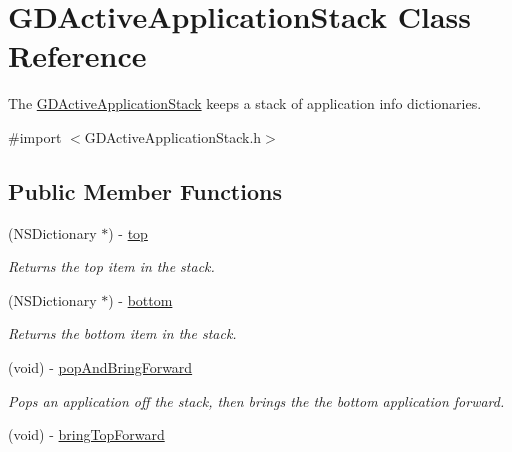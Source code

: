 \hypertarget{interface_g_d_active_application_stack}{
\section{GDActiveApplicationStack Class Reference}
\label{interface_g_d_active_application_stack}
}


The \hyperlink{interface_g_d_active_application_stack}{GDActiveApplicationStack} keeps a stack of application info dictionaries.  


{\ttfamily \#import $<$GDActiveApplicationStack.h$>$}\subsection*{Public Member Functions}
\begin{DoxyCompactItemize}
\item 
\hypertarget{interface_g_d_active_application_stack_a51fa9794d729046db9561631d4e2dc33}{
(NSDictionary $\ast$) -\/ \hyperlink{interface_g_d_active_application_stack_a51fa9794d729046db9561631d4e2dc33}{top}}
\label{interface_g_d_active_application_stack_a51fa9794d729046db9561631d4e2dc33}

\begin{DoxyCompactList}\small\item\em Returns the top item in the stack. \item\end{DoxyCompactList}\item 
\hypertarget{interface_g_d_active_application_stack_a5c475dbd5059fe0bb8a70c7fe4f6c396}{
(NSDictionary $\ast$) -\/ \hyperlink{interface_g_d_active_application_stack_a5c475dbd5059fe0bb8a70c7fe4f6c396}{bottom}}
\label{interface_g_d_active_application_stack_a5c475dbd5059fe0bb8a70c7fe4f6c396}

\begin{DoxyCompactList}\small\item\em Returns the bottom item in the stack. \item\end{DoxyCompactList}\item 
\hypertarget{interface_g_d_active_application_stack_a3a2dbff7e4b5278d599e4e3ed8abb60b}{
(void) -\/ \hyperlink{interface_g_d_active_application_stack_a3a2dbff7e4b5278d599e4e3ed8abb60b}{popAndBringForward}}
\label{interface_g_d_active_application_stack_a3a2dbff7e4b5278d599e4e3ed8abb60b}

\begin{DoxyCompactList}\small\item\em Pops an application off the stack, then brings the the bottom application forward. \item\end{DoxyCompactList}\item 
\hypertarget{interface_g_d_active_application_stack_ade441263784486ef6b06992b51d0b7bd}{
(void) -\/ \hyperlink{interface_g_d_active_application_stack_ade441263784486ef6b06992b51d0b7bd}{bringTopForward}}
\label{interface_g_d_active_application_stack_ade441263784486ef6b06992b51d0b7bd}


\end{DoxyCompactItemize}
